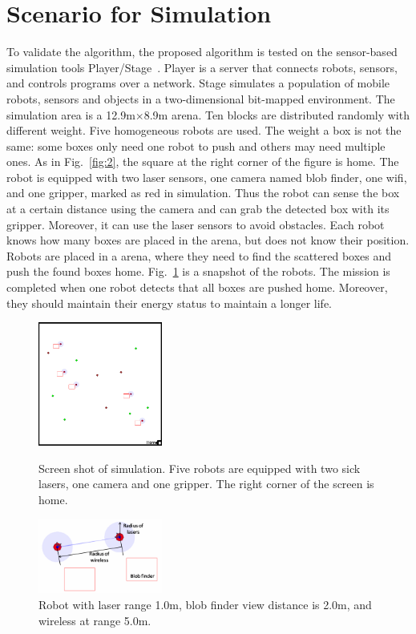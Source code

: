 \documentclass[journal]{IEEEtran}
\begin{document}
\section{Scenario for Simulation}
\label{sec:3}
To validate the algorithm, the proposed algorithm is tested on the sensor-based simulation tools Player/Stage~\cite{Gerkey}. Player is a server that connects robots, sensors, and controls programs over a network. Stage simulates a population of mobile robots, sensors and objects in a two-dimensional bit-mapped environment. The simulation area is a 12.9m$\times$8.9m arena. Ten blocks are distributed randomly with different weight. Five homogeneous robots are used. The weight a box is not the same: some boxes only need one robot to push and others may need multiple ones. As in Fig.~\ref{fig:2}, the square at the right corner of the figure is home. The robot is equipped with two laser sensors, one camera named blob finder, one wifi, and one gripper, marked as red in simulation. Thus the robot can sense the box at a certain distance using the camera and can grab the detected box with its gripper. Moreover, it can use the laser sensors to avoid obstacles. Each robot knows how many boxes are placed in the arena, but does not know their position. Robots are placed in a arena, where they need to find the scattered boxes and push the found boxes home. Fig.~\ref{fig:3} is a snapshot of the robots. The mission is completed when one robot detects that all boxes are pushed home. Moreover, they should maintain their energy status to maintain a longer life.

%
\begin{figure}[h]
\begin{minipage}[t]{0.45\linewidth}
\centering
\includegraphics[width=1.6in]{scenario.png}
\caption{Screen shot of simulation. Five robots are equipped with two sick lasers, one camera and one gripper. The right corner of the screen is home.}
\label{fig:2}       %
\end{minipage}
\hfill
\begin{minipage}[t]{0.45\linewidth}
\centering
\includegraphics[width=1.6in]{robot.png}
\caption{Robot with laser range 1.0m, blob finder view distance is 2.0m, and wireless at range 5.0m.}
\label{fig:3}       %
\end{minipage}
\end{figure}
\end{document}
